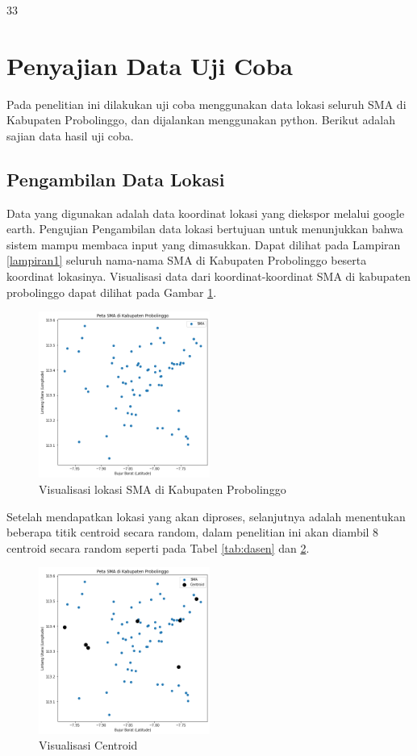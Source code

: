 33\section{Penyajian Data Uji Coba}

Pada penelitian ini dilakukan uji coba menggunakan data lokasi seluruh SMA di Kabupaten Probolinggo, dan dijalankan menggunakan python. Berikut adalah sajian data hasil uji coba.

\subsection{Pengambilan Data Lokasi}

Data yang digunakan adalah data koordinat lokasi yang diekspor melalui google earth. Pengujian Pengambilan data lokasi bertujuan untuk menunjukkan bahwa sistem 
mampu membaca input yang dimasukkan. Dapat dilihat pada Lampiran \ref{lampiran1} seluruh nama-nama SMA di Kabupaten Probolinggo beserta koordinat lokasinya. Visualisasi data dari koordinat-koordinat SMA di kabupaten probolinggo dapat dilihat pada Gambar \ref{fig:petasma}.

\begin{figure}[H]
  \centering
  \includegraphics[width=0.5\textwidth]{Gambar/peta sma.png}
  \caption{Visualisasi lokasi SMA di Kabupaten Probolinggo}
  \label{fig:petasma}
\end{figure}

Setelah mendapatkan lokasi yang akan diproses, selanjutnya adalah menentukan beberapa titik centroid secara random, dalam penelitian ini akan diambil 8 centroid secara random seperti pada Tabel \ref{tab:dasen} dan \ref{fig:visdasen}.



\begin{figure}[H]
	\centering
	\includegraphics[width=0.5\textwidth]{Gambar/titik centroid.png}
	\caption{Visualisasi Centroid}
	\label{fig:visdasen}
\end{figure}

